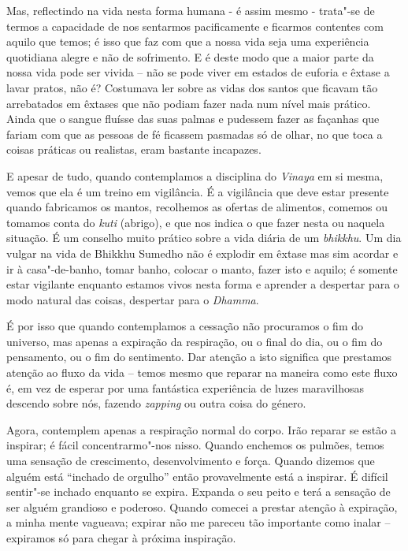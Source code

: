 Mas, reflectindo na vida nesta forma humana - é assim mesmo - trata"-se
de termos a capacidade de nos sentarmos pacificamente e ficarmos
contentes com aquilo que temos; é isso que faz com que a nossa vida seja
uma experiência quotidiana alegre e não de sofrimento. E é deste modo
que a maior parte da nossa vida pode ser vivida -- não se pode viver em
estados de euforia e êxtase a lavar pratos, não é? Costumava ler sobre
as vidas dos santos que ficavam tão arrebatados em êxtases que não
podiam fazer nada num nível mais prático. Ainda que o sangue fluísse das
suas palmas e pudessem fazer as façanhas que fariam com que as pessoas
de fé ficassem pasmadas só de olhar, no que toca a coisas práticas ou
realistas, eram bastante incapazes.

E apesar de tudo, quando contemplamos a disciplina do \emph{Vinaya} em
si mesma, vemos que ela é um treino em vigilância. É a vigilância que
deve estar presente quando fabricamos os mantos, recolhemos as ofertas
de alimentos, comemos ou tomamos conta do \emph{kuti} (abrigo), e que
nos indica o que fazer nesta ou naquela situação. É um conselho muito
prático sobre a vida diária de um \emph{bhikkhu}. Um dia vulgar na vida
de Bhikkhu Sumedho não é explodir em êxtase mas sim acordar e ir à
casa"-de-banho, tomar banho, colocar o manto, fazer isto e aquilo; é
somente estar vigilante enquanto estamos vivos nesta forma e aprender a
despertar para o modo natural das coisas, despertar para o
\emph{Dhamma}.

É por isso que quando contemplamos a cessação não procuramos o fim do
universo, mas apenas a expiração da respiração, ou o final do dia, ou o
fim do pensamento, ou o fim do sentimento. Dar atenção a isto significa
que prestamos atenção ao fluxo da vida -- temos mesmo que reparar na
maneira como este fluxo é, em vez de esperar por uma fantástica
experiência de luzes maravilhosas descendo sobre nós, fazendo
\emph{zapping} ou outra coisa do género.

Agora, contemplem apenas a respiração normal do corpo. Irão reparar se
estão a inspirar; é fácil concentrarmo"-nos nisso. Quando enchemos os
pulmões, temos uma sensação de crescimento,  desenvolvimento e força.
Quando dizemos que alguém está ``inchado de orgulho'' então
provavelmente está a inspirar. É difícil sentir"-se inchado enquanto se
expira. Expanda o seu peito e terá a sensação de ser alguém grandioso e
poderoso. Quando comecei a prestar atenção à expiração, a minha mente
vagueava; expirar não me pareceu tão importante como inalar -- expiramos
só para chegar à próxima inspiração.

